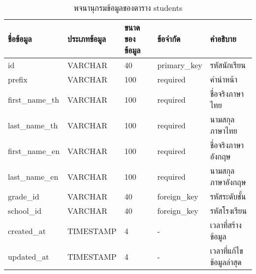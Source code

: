 \begin{table}[H]
    \caption{พจนานุกรมข้อมูลของตาราง students}
    \label{tab:database-students}
    \begin{tabularx}{\textwidth}{ | p{2.25cm} | p{2.20cm} | p{2.45cm} | p{2cm} | X | }
    \hline
    \textbf{ชื่อข้อมูล} & \textbf{ประเภทข้อมูล} & \textbf{ขนาดของข้อมูล} & \textbf{ข้อจำกัด} & \textbf{คำอธิบาย} \\
    \hline
    id & VARCHAR & 40 & primary\_key & รหัสนักเรียน \\
    \hline
    prefix & VARCHAR & 100 & required & คำนำหน้า \\
    \hline
    first\_name\_th & VARCHAR & 100 & required & ชื่อจริงภาษาไทย \\
    \hline
    last\_name\_th & VARCHAR & 100 & required & นามสกุลภาษาไทย \\
    \hline
    first\_name\_en & VARCHAR & 100 & required & ชื่อจริงภาษาอังกฤษ \\
    \hline
    last\_name\_en & VARCHAR & 100 & required & นามสกุลภาษาอังกฤษ \\
    \hline
    grade\_id & VARCHAR & 40 & foreign\_key & รหัสระดับชั้น \\
    \hline
    school\_id & VARCHAR & 40 & foreign\_key & รหัสโรงเรียน \\
    \hline
    created\_at & TIMESTAMP & 4 & - & เวลาที่สร้างข้อมูล \\
    \hline
    updated\_at & TIMESTAMP & 4 & - & เวลาที่แก้ไขข้อมูลล่าสุด \\
    \hline
    \end{tabularx}
\end{table}
